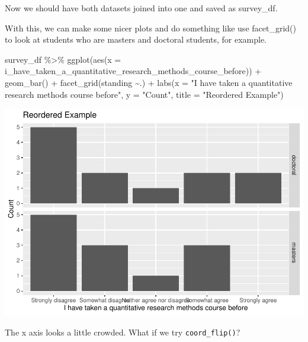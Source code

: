 \documentclass[
]{book}
\newenvironment{Shaded}{\begin{snugshade}}{\end{snugshade}}
\newcommand{\AttributeTok}[1]{\textcolor[rgb]{0.77,0.63,0.00}{#1}}
\newcommand{\FunctionTok}[1]{\textcolor[rgb]{0.00,0.00,0.00}{#1}}
\newcommand{\NormalTok}[1]{#1}
\newcommand{\SpecialCharTok}[1]{\textcolor[rgb]{0.00,0.00,0.00}{#1}}
\newcommand{\StringTok}[1]{\textcolor[rgb]{0.31,0.60,0.02}{#1}}
\begin{document}
Now we should have both datasets joined into one and saved as survey\_df.

With this, we can make some nicer plots and do something like use facet\_grid() to look at students who are masters and doctoral students, for example.

\begin{Shaded}
\begin{Highlighting}[]
\NormalTok{survey\_df }\SpecialCharTok{\%\textgreater{}\%} 
  \FunctionTok{ggplot}\NormalTok{(}\FunctionTok{aes}\NormalTok{(}\AttributeTok{x =}\NormalTok{ i\_have\_taken\_a\_quantitative\_research\_methods\_course\_before)) }\SpecialCharTok{+}
  \FunctionTok{geom\_bar}\NormalTok{() }\SpecialCharTok{+}
  \FunctionTok{facet\_grid}\NormalTok{(standing }\SpecialCharTok{\textasciitilde{}}\NormalTok{.) }\SpecialCharTok{+}
  \FunctionTok{labs}\NormalTok{(}\AttributeTok{x =} \StringTok{"I have taken a quantitative research methods course before"}\NormalTok{,}
       \AttributeTok{y =} \StringTok{"Count"}\NormalTok{,}
       \AttributeTok{title =} \StringTok{"Reordered Example"}\NormalTok{)}
\end{Highlighting}
\end{Shaded}

\includegraphics{test_course_notes_files/figure-latex/unnamed-chunk-35-1.pdf}

The x axis looks a little crowded. What if we try \texttt{coord\_flip()}?
\end{document}
